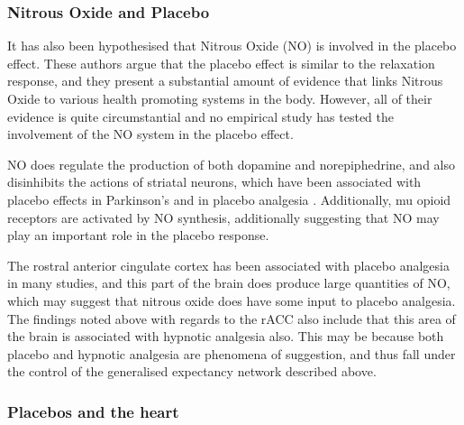 \subsubsection{Nitrous Oxide and Placebo}
\label{sec:nitr-oxide-plac}

It has also been hypothesised \cite{Stefano2001,Fricchione2005} that Nitrous Oxide (NO) is involved in the placebo effect. These authors argue that the placebo effect is similar to the relaxation response, and they present a substantial amount of evidence that links Nitrous Oxide to various health promoting systems in the body. However, all of their evidence is quite circumstantial and no empirical study has tested the involvement of the NO system in the placebo effect.  

NO does regulate the production of both dopamine and norepiphedrine, and also disinhibits the actions of striatal neurons, which have been associated with placebo effects in Parkinson's and in placebo analgesia \cite{Fricchione2005,Fuente-FernAAndez2001}. Additionally, mu opioid receptors are activated by NO synthesis, additionally suggesting that NO may play an important role in the placebo response. 

 The rostral anterior cingulate cortex has been associated with placebo analgesia in many studies, and this part of the brain does produce large quantities of  NO, which may suggest that nitrous oxide does have some input to placebo analgesia. The findings noted above with regards to the rACC also include that this area of the brain is associated with hypnotic analgesia also. This may be because both placebo and hypnotic analgesia are phenomena of suggestion, and thus fall under the control of the generalised expectancy network described above.  



\subsubsection{Placebos and the heart}
\label{sec:placebos-heart}

